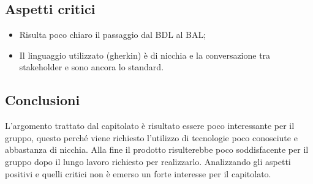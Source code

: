 \subsection{Aspetti critici}
\begin{itemize}
\item Risulta poco chiaro il passaggio dal BDL al BAL;
\item Il linguaggio utilizzato (gherkin) è di nicchia e la conversazione tra stakeholder e  sono ancora lo standard.
\end{itemize}

\subsection{Conclusioni}
L'argomento trattato dal capitolato è risultato essere poco interessante per il gruppo, questo perché viene richiesto l'utilizzo di tecnologie poco conosciute e abbastanza di nicchia. Alla fine il prodotto risulterebbe poco soddisfacente per il gruppo dopo il lungo lavoro richiesto per realizzarlo.
Analizzando gli aspetti positivi e quelli critici non è emerso un forte interesse per il capitolato.